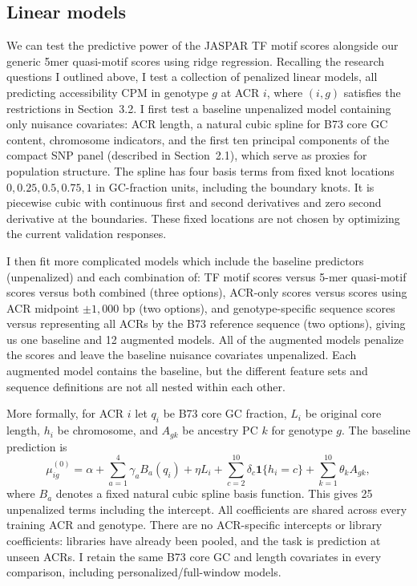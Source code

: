 \documentclass[10pt]{article}
\begin{document}
\subsection{Linear models}\label{sec:linear-models}
We can test the predictive power of the JASPAR TF motif scores alongside our generic 5mer quasi-motif scores using ridge regression. Recalling the research questions I outlined above, I test a collection of penalized linear models, all predicting accessibility CPM in genotype $g$ at ACR $i$, where $(i,g)$ satisfies the restrictions in Section~3.2. I first test a baseline unpenalized model containing only nuisance covariates: ACR length, a natural cubic spline for B73 core GC content, chromosome indicators, and the first ten principal components of the compact SNP panel (described in Section~2.1), which serve as proxies for population structure. The spline has four basis terms from fixed knot locations $0,0.25,0.5,0.75,1$ in GC-fraction units, including the boundary knots. It is piecewise cubic with continuous first and second derivatives and zero second derivative at the boundaries. These fixed locations are not chosen by optimizing the current validation responses.

I then fit more complicated models which include the baseline predictors (unpenalized) and each combination of: TF motif scores versus 5-mer quasi-motif scores versus both combined (three options), ACR-only scores versus scores using ACR midpoint $\pm1,000$ bp (two options), and genotype-specific sequence scores versus representing all ACRs by the B73 reference sequence (two options), giving us one baseline and 12 augmented models. All of the augmented models penalize the scores and leave the baseline nuisance covariates unpenalized. Each augmented model contains the baseline, but the different feature sets and sequence definitions are not all nested within each other.

More formally, for ACR $i$ let $q_i$ be B73 core GC fraction, $L_i$ be original core length, $h_i$ be chromosome, and $A_{gk}$ be ancestry PC $k$ for genotype $g$. The baseline prediction is
\begin{equation}\label{eq:baseline}
\mu^{(0)}_{ig}=\alpha+\sum_{a=1}^{4}\gamma_a B_a(q_i)
+\eta L_i+\sum_{c=2}^{10}\delta_c\mathbf1\{h_i=c\}
+\sum_{k=1}^{10}\theta_k A_{gk},
\end{equation}
where $B_a$ denotes a fixed natural cubic spline basis function. This gives 25 unpenalized terms including the intercept. All coefficients are shared across every training ACR and genotype. There are no ACR-specific intercepts or library coefficients: libraries have already been pooled, and the task is prediction at unseen ACRs. I retain the same B73 core GC and length covariates in every comparison, including personalized/full-window models.
\end{document}
